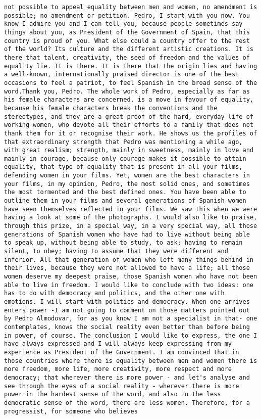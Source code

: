 \documentclass[
]{article}
\begin{document}
\begin{verbatim}
not possible to appeal equality between men and women, no amendment is possible; no amendment or petition. Pedro, I start with you now. You know I admire you and I can tell you, because people sometimes say things about you, as President of the Government of Spain, that this country is proud of you. What else could a country offer to the rest of the world? Its culture and the different artistic creations. It is there that talent, creativity, the seed of freedom and the values of equality lie. It is there. It is there that the origin lies and having a well-known, internationally praised director is one of the best occasions to feel a patriot, to feel Spanish in the broad sense of the word.Thank you, Pedro. The whole work of Pedro, especially as far as his female characters are concerned, is a move in favour of equality, because his female characters break the conventions and the stereotypes, and they are a great proof of the hard, everyday life of working women, who devote all their efforts to a family that does not thank them for it or recognise their work. He shows us the profiles of that extraordinary strength that Pedro was mentioning a while ago, with great realism; strength, mainly in sweetness, mainly in love and mainly in courage, because only courage makes it possible to attain equality, that type of equality that is present in all your films, defending women in your films. Yet, women are the best characters in your films, in my opinion, Pedro, the most solid ones, and sometimes the most tormented and the best defined ones. You have been able to outline them in your films and several generations of Spanish women have seen themselves reflected in your films. We saw this when we were having a look at some of the photographs. I would also like to praise, through this prize, in a special way, in a very special way, all those generations of Spanish women who have had to live without being able to speak up, without being able to study, to ask; having to remain silent, to obey; having to assume that they were different and inferior. All that generation of women who left many things behind in their lives, because they were not allowed to have a life; all those women deserve my deepest praise, those Spanish women who have not been able to live in freedom. I would like to conclude with two ideas: one has to do with democracy and politics, and the other one with emotions. I will start with politics and democracy. When one arrives enters power -I am not going to comment on those matters pointed out by Pedro Almodovar, for as you know I am not a specialist in that- one contemplates, knows the social reality even better than before being in power, of course. The conclusion I would like to express, the one I have always expressed and I will always keep expressing from my experience as President of the Government. I am convinced that in those countries where there is equality between men and women there is more freedom, more life, more creativity, more respect and more democracy; that wherever there is more power - and let's analyse and see through the eyes of a social reality - wherever there is more power in the hardest sense of the word, and also in the less democratic sense of the word, there are less women. Therefore, for a progressist, for someone who believes 
\end{verbatim}
\end{document}
